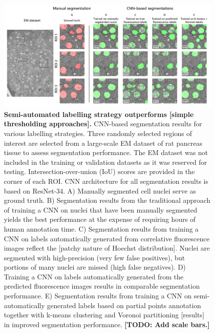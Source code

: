\begin{figure}[!tbh]
    \centering
    \includegraphics[width=\linewidth]{chapter-4/figures/fig5_segmentation_v3.pdf}
    \caption{\textbf{Semi-automated labelling strategy outperforms [simple thresholding approaches].}
    CNN-based segmentation results for various labelling strategies. Three randomly selected regions of interest are selected from a large-scale EM dataset of rat pancreas tissue to assess segmentation performance. The EM dataset was not included in the training or validation datasets as it was reserved for testing. Intersection-over-union (IoU) scores are provided in the corner of each ROI. CNN architecture for all segmentation results is based on ResNet-34.
    A) Manually segmented cell nuclei serve as ground truth. B) Segmentation results from the traditional approach of training a CNN on nuclei that have been manually segmented yields the best performance at the expense of requiring hours of human annotation time.
    C) Segmentation results from training a CNN on labels automatically generated from correlative fluorescence images reflect the [patchy nature of Hoechst distribution]. Nuclei are segmented with high-precision (very few false positives), but portions of many nuclei are missed (high false negatives).
    D) Training a CNN on labels automatically generated from the predicted fluorescence images results in comparable segmentation performance.
    E) Segmentation results from training a CNN on semi-automatically generated labels based on partial points annotation together with k-means clustering and Voronoi partitioning [results] in improved segmentation performance.
    \textbf{[TODO: Add scale bars.]}}
    \label{fig:4.6_segmentation}
\end{figure}



\clearpage

